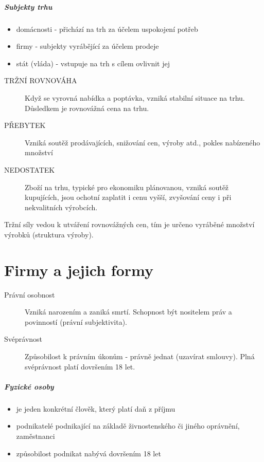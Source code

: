 \documentclass[11pt,a4paper,twoside]{book}
\begin{document}
	\paragraph*{Subjekty trhu}
	\begin{itemize}
		\item domácnosti - přichází na trh za účelem uspokojení potřeb
		\item firmy - subjekty vyrábějící za účelem prodeje
		\item stát (vláda) - vstupuje na trh s cílem ovlivnit jej
	\end{itemize}
	
	\begin{description}
		\item[TRŽNÍ ROVNOVÁHA] Když se vyrovná nabídka a poptávka, vzniká stabilní situace na trhu. Důsledkem je rovnovážná cena na trhu.
		\item[PŘEBYTEK] Vzniká soutěž prodávajících, snižování cen, výroby atd., pokles nabízeného množství
		\item[NEDOSTATEK] Zboží na trhu, typické pro ekonomiku plánovanou, vzniká soutěž kupujících, jsou ochotní zaplatit i cenu vyšší, zvyšování ceny i při nekvalitních výrobcích.
	\end{description}
	
	Tržní síly vedou k utváření rovnovážných cen, tím je určeno vyráběné množství výrobků (struktura výroby).
	
	\chapter{Firmy a jejich formy}
	
	\begin{description}
		\item[Právní osobnost] Vzniká narozením a zaniká smrtí. Schopnost být nositelem práv a povinností (právní subjektivita).
		\item[Svéprávnost] Způsobilost k právním úkonům - právně jednat (uzavírat smlouvy). Plná svéprávnost platí dovršením 18 let.
	\end{description}
	
	\paragraph{Fyzické osoby}
	
	\begin{itemize}
		\item je jeden konkrétní člověk, který platí daň z příjmu
		\item podnikatelé podnikající na základě živnostenského či jiného oprávnění, zaměstnanci
		\item způsobilost podnikat nabývá dovršením 18 let
	\end{itemize}
	
\end{document}
